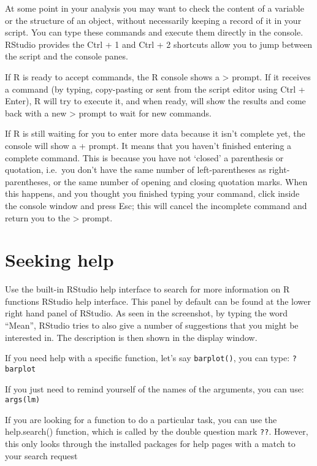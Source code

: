 \documentclass[]{book}
\begin{document}
At some point in your analysis you may want to check the content of a
variable or the structure of an object, without necessarily keeping a
record of it in your script. You can type these commands and execute
them directly in the console. RStudio provides the Ctrl + 1 and Ctrl + 2
shortcuts allow you to jump between the script and the console panes.

If R is ready to accept commands, the R console shows a \textgreater{}
prompt. If it receives a command (by typing, copy-pasting or sent from
the script editor using Ctrl + Enter), R will try to execute it, and
when ready, will show the results and come back with a new
\textgreater{} prompt to wait for new commands.

If R is still waiting for you to enter more data because it isn't
complete yet, the console will show a + prompt. It means that you
haven't finished entering a complete command. This is because you have
not `closed' a parenthesis or quotation, i.e.~you don't have the same
number of left-parentheses as right-parentheses, or the same number of
opening and closing quotation marks. When this happens, and you thought
you finished typing your command, click inside the console window and
press Esc; this will cancel the incomplete command and return you to the
\textgreater{} prompt.

\section{Seeking help}\label{seeking-help}

Use the built-in RStudio help interface to search for more information
on R functions RStudio help interface. This panel by default can be
found at the lower right hand panel of RStudio. As seen in the
screenshot, by typing the word ``Mean'', RStudio tries to also give a
number of suggestions that you might be interested in. The description
is then shown in the display window.

If you need help with a specific function, let's say \texttt{barplot()},
you can type: \texttt{?barplot}

If you just need to remind yourself of the names of the arguments, you
can use: \texttt{args(lm)}

If you are looking for a function to do a particular task, you can use
the help.search() function, which is called by the double question mark
\texttt{??}. However, this only looks through the installed packages for
help pages with a match to your search request
\end{document}
